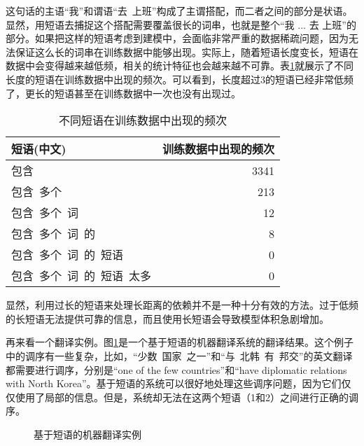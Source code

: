 \parinterval 这句话的主语``我''和谓语``去\ 上班''构成了主谓搭配，而二者之间的部分是状语。显然，用短语去捕捉这个搭配需要覆盖很长的词串，也就是整个``我 $...$ 去 上班''的部分。如果把这样的短语考虑到建模中，会面临非常严重的数据稀疏问题，因为无法保证这么长的词串在训练数据中能够出现。实际上，随着短语长度变长，短语在数据中会变得越来越低频，相关的统计特征也会越来越不可靠。表\ref{tab:4-1}就展示了不同长度的短语在训练数据中出现的频次。可以看到，长度超过3的短语已经非常低频了，更长的短语甚至在训练数据中一次也没有出现过。

\begin{table}[htp]{
\begin{center}
\caption{不同短语在训练数据中出现的频次}
\label{tab:4-1}
\begin{tabular}{l | r}
短语(中文) & 训练数据中出现的频次 \\
\hline

包含 & 3341\\
包含\ 多个 & 213\\
包含\ 多个\ 词 & 12\\
包含\ 多个\ 词\ 的 & 8\\
包含\ 多个\ 词\ 的\ 短语 & 0\\
包含\ 多个\ 词\ 的\ 短语\ 太多 & 0\\
\end{tabular}
\end{center}
}\end{table}

\parinterval 显然，利用过长的短语来处理长距离的依赖并不是一种十分有效的方法。过于低频的长短语无法提供可靠的信息，而且使用长短语会导致模型体积急剧增加。

\parinterval 再来看一个翻译实例\cite{Chiang2012Hope}。图\ref{fig:4-31}是一个基于短语的机器翻译系统的翻译结果。这个例子中的调序有一些复杂，比如，``少数\ 国家\ 之一''和``与\ 北韩\ 有\ 邦交''的英文翻译都需要进行调序，分别是``one of the few countries''和``have diplomatic relations with North Korea''。基于短语的系统可以很好地处理这些调序问题，因为它们仅仅使用了局部的信息。但是，系统却无法在这两个短语（1和2）之间进行正确的调序。

\begin{figure}[htp]
\centering

\caption{基于短语的机器翻译实例\cite{Chiang2012Hope}}
\label{fig:4-31}
\end{figure}

